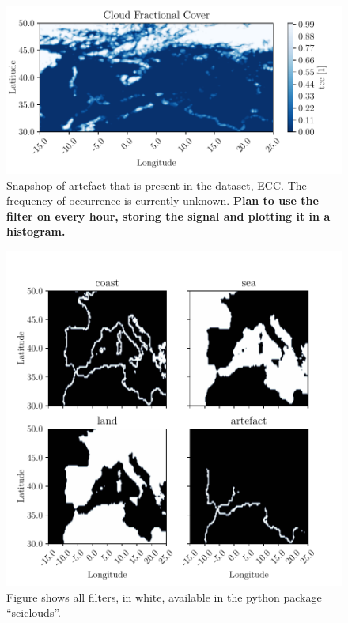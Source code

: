 \begin{figure}
    \centering
    \includegraphics{python_figs/example_artefact.pdf}
    \caption[Artefact in European Cloud Cover dataset.]{Snapshop of artefact that is present in the dataset, ECC. The frequency of occurrence is currently unknown. \textbf{Plan to use the filter on every hour, storing the signal and plotting it in a histogram.}}
    \label{fig:example_artefact}
\end{figure}

\begin{figure}
    \centering
    \includegraphics{python_figs/filters.pdf}
    \caption{Figure shows all filters, in white, available in the python package ``sciclouds''.}
    \label{fig:filters_subplot}
\end{figure}

